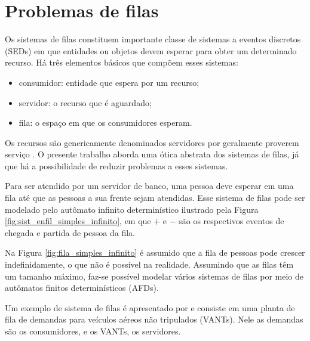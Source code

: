 \chapter{Problemas de filas}
\label{cap:filas}

Os sistemas de filas constituem importante classe de sistemas a eventos discretos (\acs{SED}s) em que entidades ou objetos devem esperar para obter um determinado recurso. Há três elementos básicos que compõem esses sistemas: \begin{itemize}
	\item consumidor: entidade que espera por um recurso;
	\item servidor: o recurso que é aguardado;
	\item fila: o espaço em que os consumidores esperam.
\end{itemize} Os recursos são genericamente denominados servidores por geralmente proverem serviço \cite{cassandras}. O presente trabalho aborda uma ótica abstrata dos sistemas de filas, já que há a possibilidade de reduzir problemas a esses sistemas.

Para ser atendido por um servidor de banco, uma pessoa deve esperar em uma fila até que as pessoas a sua frente sejam atendidas. Esse sistema de filas pode ser modelado pelo autômato infinito determinístico ilustrado pela Figura \ref{fig:sist_enfil_simples_infinito}, em que $+$ e $-$ são os respectivos eventos de chegada e partida de pessoa da fila.


Na Figura \ref{fig:fila_simples_infinito} é assumido que a fila de pessoas pode crescer indefinidamente, o que não é possível na realidade. Assumindo que as filas têm um tamanho máximo, faz-se possível modelar vários sistemas de filas por meio de autômatos finitos determinísticos (AFDs).

Um exemplo de sistema de filas é apresentado por  e consiste em uma planta de fila de demandas para veículos aéreos não tripulados (\acs{VANT}s). Nele as demandas são os consumidores, e os VANTs, os servidores.

